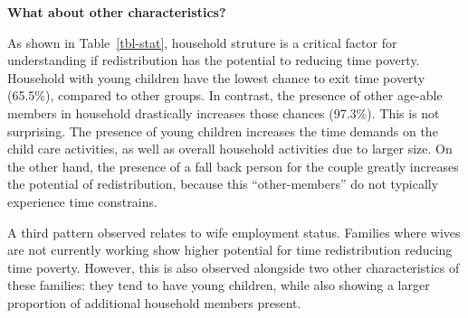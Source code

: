 \documentclass[
  11pt,
]{article}
\begin{document}
\textbf{What about other characteristics?}

As shown in Table~\ref{tbl-stat}, household struture is a critical
factor for understanding if redistribution has the potential to reducing
time poverty. Household with young children have the lowest chance to
exit time poverty (65.5\%), compared to other groups. In contrast, the
presence of other age-able members in household drastically increases
those chances (97.3\%). This is not surprising. The presence of young
children increases the time demands on the child care activities, as
well as overall household activities due to larger size. On the other
hand, the presence of a fall back person for the couple greatly
increases the potential of redistribution, because this
``other-members'' do not typically experience time constrains.

A third pattern observed relates to wife employment status. Families
where wives are not currently working show higher potential for time
redistribution reducing time poverty. However, this is also observed
alongside two other characteristics of these families: they tend to have
young children, while also showing a larger proportion of additional
household members present.

\begin{table}

\caption{\label{tbl-stat}Summary Statistics Population}


\end{table}%
\end{document}
